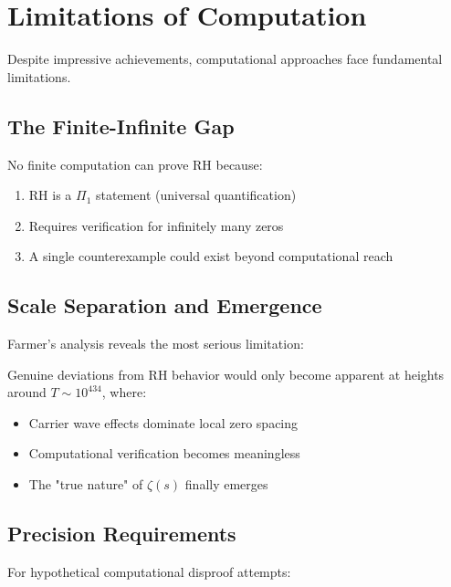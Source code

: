 \section{Limitations of Computation}
\label{sec:computational-limits}

Despite impressive achievements, computational approaches face fundamental limitations.

\subsection{The Finite-Infinite Gap}

\begin{theorem}
No finite computation can prove RH because:
\begin{enumerate}
\item RH is a $\Pi_1$ statement (universal quantification)
\item Requires verification for infinitely many zeros
\item A single counterexample could exist beyond computational reach
\end{enumerate}
\end{theorem}

\subsection{Scale Separation and Emergence}

Farmer's analysis reveals the most serious limitation:

\begin{problem}
Genuine deviations from RH behavior would only become apparent at heights around $T \sim 10^{434}$, where:
\begin{itemize}
\item Carrier wave effects dominate local zero spacing
\item Computational verification becomes meaningless
\item The "true nature" of $\zeta(s)$ finally emerges
\end{itemize}
\end{problem}

\subsection{Precision Requirements}

For hypothetical computational disproof attempts:

